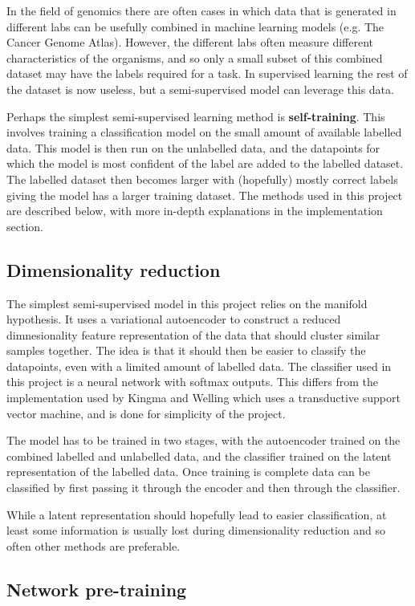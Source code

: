 \documentclass[12pt,a4paper,twoside,openright]{report}
\begin{document}
In the field of genomics there are often cases in which data that is generated in different labs can be usefully combined in machine learning
models (e.g. The Cancer Genome Atlas). However, the different labs often measure different characteristics of the organisms, and so only a 
small subset of this combined dataset may have the labels required for a task. In supervised learning the rest of the dataset is now useless,
but a semi-supervised model can leverage this data.

Perhaps the simplest semi-supervised learning method is \textbf{self-training}. This involves training a classification model on the small
amount of available labelled data. This model is then run on the unlabelled data, and the datapoints for which the model is most confident
of the label are added to the labelled dataset. The labelled dataset then becomes larger with (hopefully) mostly correct labels giving the 
model has a larger training dataset. The methods used in this project are described below, with more in-depth explanations in the 
implementation section.

\subsection{Dimensionality reduction}

The simplest semi-supervised model in this project relies on the manifold hypothesis. It uses a variational autoencoder to construct a
reduced dimnesionality feature representation of the data that should cluster similar samples together. The idea is that it should then be 
easier to classify the datapoints, even with a limited amount of labelled data. The classifier used in this project is a neural network 
with softmax outputs. This differs from the implementation used by Kingma and Welling which uses a transductive support vector machine, 
and is done for simplicity of the project.

The model has to be trained in two stages, with the autoencoder trained on the combined labelled and unlabelled data, and the classifier
trained on the latent representation of the labelled data. Once training is complete data can be classified by first passing it through 
the encoder and then through the classifier.

While a latent representation should hopefully lead to easier classification, at least some information is usually lost during dimensionality
reduction and so often other methods are preferable.

\subsection{Network pre-training} \label{sdae}
\end{document}
